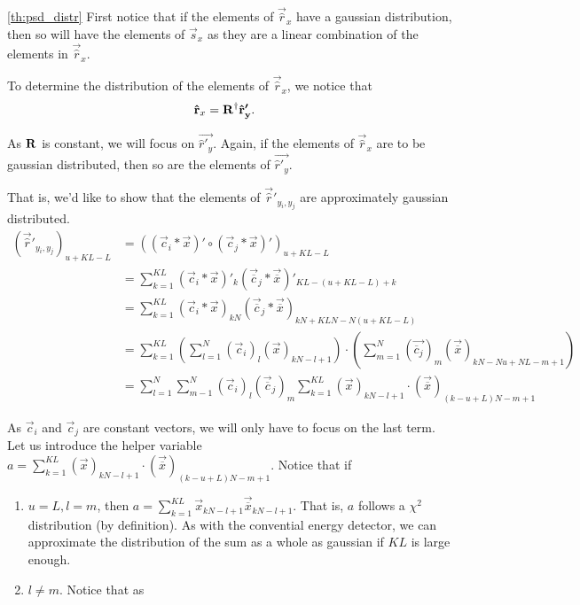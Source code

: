 \documentclass[a4paper, openany, oneside]{memoir}
\begin{document}
\begin{blockProofTheorem}{\ref{th:psd_distr}}
First notice that if the elements of $\vec{\hat{r}}_x$ have a gaussian distribution, then so will have the elements of $\vec{s}_x$ as they are a linear combination of the elements in $\vec{\hat{r}}_x$.

To determine the distribution of the elements of $\vec{\hat{r}}_x$, we notice that 
\begin{align*}
\boldsymbol{\mathbf{\hat{r}}}_x &= \boldsymbol{\mathbf{R}}^{\dagger}\boldsymbol{\mathbf{\hat{r}'_y}}.
\end{align*}

As $\boldsymbol{\mathbf{R}}$ is constant, we will focus on $\vec{\hat{r}'_y}$. Again, if the elements of $\vec{\hat{r}}_x$ are to be gaussian distributed, then so are the elements of $\vec{\hat{r}'_y}$.

That is, we'd like to show that the elements of $\vec{\hat{r}}'_{y_i,y_j}$ are approximately gaussian distributed.
\begin{align*}
(\vec{\hat{r}}'_{y_i,y_j})_{u+KL-L} &= \left(\left(\vec{c}_i\ast\vec{x}\right)' \circ \left(\vec{c}_j\ast\vec{x}\right)' \right)_{u+KL-L} \\
&= \sum_{k=1}^{KL} \left(\vec{c}_i\ast\vec{x}\right)'_k \left(\vec{\overline{c}}_j\ast\vec{\overline{x}}\right)'_{KL-(u+KL-L)+k} \\
&= \sum_{k=1}^{KL} \left(\vec{c}_i\ast\vec{x}\right)_{kN} \left(\vec{\overline{c}}_j\ast\vec{\overline{x}}\right)_{kN+KLN-N(u+KL-L)}\\
&=  \sum_{k=1}^{KL} \left(\sum_{l=1}^N \left(\vec{c}_i\right)_l\left(\vec{x}\right)_{kN-l+1}\right) \cdot \left(\sum_{m=1}^{N} \left(\vec{\overline{c}_j}\right)_m\left(\vec{\overline{x}}\right)_{kN - Nu + NL - m+1}\right)\\
&= \sum_{l=1}^N\sum_{m-1}^N \left(\vec{c}_i\right)_l \left(\vec{\overline{c}}_j\right)_m \sum_{k=1}^{KL} (\vec{x})_{kN-l+1} \cdot (\vec{\overline{x}})_{(k-u+L)N - m+1}
\end{align*}

As $\vec{c}_i$ and $\vec{c}_j$ are constant vectors, we will only have to focus on the last term. Let us introduce the helper variable $a =  \sum_{k=1}^{KL} (\vec{x})_{kN-l+1} \cdot (\vec{\overline{x}})_{(k-u+L)N - m+1}$. Notice that if

\begin{enumerate}
	\item $u=L, l=m$, then $a = \sum_{k=1}^{KL}\vec{x}_{kN-l+1}\vec{\overline{x}}_{kN-l+1}$. That is, $a$ follows a $\chi^2$ distribution (by definition). As with the convential energy detector, we can approximate the distribution of the sum as a whole as gaussian if $KL$ is large enough.
	\item $l \neq m$. Notice that as 


\end{enumerate}
\end{blockProofTheorem}
\end{document}
